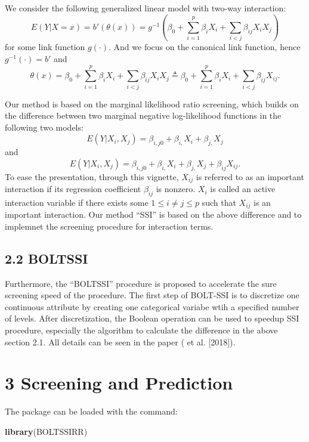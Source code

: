 \documentclass[]{article}
\newenvironment{Shaded}{\begin{snugshade}}{\end{snugshade}}
\newcommand{\KeywordTok}[1]{\textcolor[rgb]{0.13,0.29,0.53}{\textbf{#1}}}
\newcommand{\NormalTok}[1]{#1}
\begin{document}
We consider the following generalized linear model with two-way
interaction:
\[E(Y|X=x)=b'(\theta(x))=g^{-1}\left(\beta_0+\sum_{i=1}^p\beta_iX_i+\sum_{i<j}\beta_{ij}X_iX_j\right)
\] for some link function \(g(\cdot)\). And we focus on the canonical
link function, hence \(g^{-1}(\cdot)=b'\) and
\[\theta(x)=\beta_0+\sum_{i=1}^p\beta_iX_i+\sum_{i<j}\beta_{ij}X_iX_j\triangleq\beta_0+\sum_{i=1}^p\beta_iX_i+\sum_{i<j}\beta_{ij}X_{ij}.\]

Our method is based on the marginal likelihood ratio screening, which
builds on the difference between two marginal negative log-likelihood
functions in the following two models:
\[E(Y|X_i,X_j)=\beta_{i,j0}+\beta_{i,}X_i+\beta_{j,}X_j\] and
\[E(Y|X_i,X_j)=\beta_{i,j0}+\beta_{i,}X_i+\beta_{j,}X_j+\beta_{ij}X_{ij}.\]
To ease the presentation, through this vignette, \(X_{ij}\) is referred
to as an important interaction if its regression coefficient
\(\beta_{ij}\) is nonzero. \(X_i\) is called an active interaction
variable if there exists some \(1 \leq i\neq j \leq p\) such that
\(X_{ij}\) is an important interaction. Our method ``SSI'' is based on
the above difference and to implemnet the screening procedure for
interaction terms.

\subsection{2.2 BOLTSSI}\label{boltssi}

Furthermore, the ``BOLTSSI'' procedure is proposed to accelerate the
sure screening speed of the procedure. The first step of BOLT-SSI is to
discretize one continuous attribute by creating one categorical variabe
wtih a specified number of levels. After discretization, the Boolean
operation can be used to speedup SSI procedure, especially the algorithm
to calculate the difference in the above section 2.1. All details can be
seen in the paper ( et al. {[}2018{]}).

\section{3 Screening and Prediction}\label{screening-and-prediction}

The package can be loaded with the command:

\begin{Shaded}
\begin{Highlighting}[]
\KeywordTok{library}\NormalTok{(BOLTSSIRR)}
\end{Highlighting}
\end{Shaded}
\end{document}
